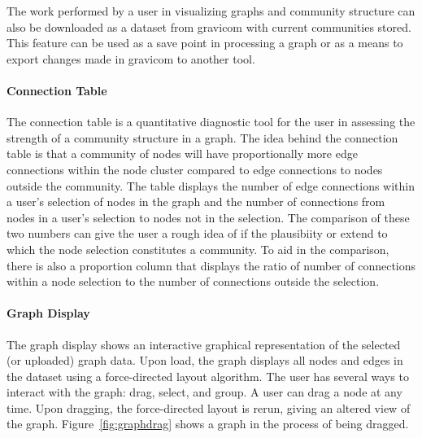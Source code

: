 \documentclass{article}\usepackage[]{graphicx}\usepackage[]{color}
\begin{document}
The work performed by a user in visualizing graphs and community structure can also be downloaded as a dataset from gravicom with current communities stored. This feature can be used as a save point in processing a graph or as a means to export changes made in gravicom to another tool.

\paragraph{Connection Table}
The connection table is a quantitative diagnostic tool for the user in assessing the strength of a community structure in a graph. The idea behind the connection table is that a community of nodes will have proportionally more edge connections within the node cluster compared to edge connections to nodes outside the community. The table displays the number of edge connections within a user's selection of nodes in the graph and the number of connections from nodes in a user's selection to nodes not in the selection. The comparison of these two numbers can give the user a rough idea of if the plausibiity or extend to which the node selection constitutes a community. To aid in the comparison, there is also a proportion column that displays the ratio of number of connections within a node selection to the number of connections outside the selection. 

\paragraph{Graph Display}
The graph display shows an interactive graphical representation of  the selected (or uploaded) graph data. Upon load, the graph displays all nodes and edges in the dataset using a force-directed layout algorithm. The user has several ways to interact with the graph: drag, select, and group. A user can drag a node at any time. %
Upon dragging, the force-directed layout is  rerun, giving an altered view of the graph. Figure~\ref{fig:graphdrag} shows a graph in the process of being dragged.
\end{document}

